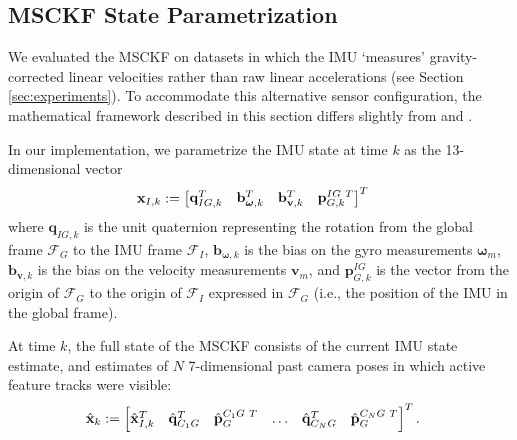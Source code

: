 \documentclass[letterpaper, 10 pt, conference]{ieeeconf}  %
\def\Vec#1{\mathbf{#1}}
\newcommand{\bbm}{\begin{bmatrix}}
\newcommand{\ebm}{\end{bmatrix}}
\begin{document}
\subsection{MSCKF State Parametrization}
We evaluated the MSCKF on datasets in which the IMU `measures' gravity-corrected linear velocities rather than raw linear accelerations (see Section \ref{sec:experiments}).
To accommodate this alternative sensor configuration, the mathematical framework described in this section differs slightly from \cite{Mourikis:2006:TechReport} and \cite{Mourikis:2007:ICRA}.

In our implementation, we parametrize the IMU state at time $k$ as the 13-dimensional vector
\begin{align}
    \Vec{x}_{I,k} &:= \bbm \Vec{q}_{IG,k}^T & \Vec{b}_{\boldsymbol{\omega},k}^T & \Vec{b}_{\Vec{v},k}^T & \Vec{p}_{G,k}^{IG \hspace{0.3em} T} \ebm^T
\end{align}
where $\Vec{q}_{IG,k}$ is the unit quaternion representing the rotation from the global frame $\mathcal{F}_G$ to the IMU frame $\mathcal{F}_I$, $\Vec{b}_{\boldsymbol{\omega},k}$ is the bias on the gyro measurements $\boldsymbol{\omega}_m$, $\Vec{b}_{\Vec{v},k}$ is the bias on the velocity measurements $\Vec{v}_m$, and $\Vec{p}_{G,k}^{IG}$ is the vector from the origin of $\mathcal{F}_G$ to the origin of $\mathcal{F}_I$ expressed in $\mathcal{F}_G$ (i.e., the position of the IMU in the global frame).

At time $k$, the full state of the MSCKF consists of the current IMU state estimate, and estimates of $N$ 7-dimensional past camera poses in which active feature tracks were visible:
\begin{align*}
    \hat{\Vec{x}}_k &:= \bbm \hat{\Vec{x}}_{I,k}^T & \hat{\Vec{q}}_{C_1 G}^T & \hat{\Vec{p}}_G^{C_1 G \hspace{0.3em} T} & \hdots & \hat{\Vec{q}}_{C_N G}^T & \hat{\Vec{p}}_G^{C_N G \hspace{0.3em} T} \ebm ^T.
\end{align*}
\end{document}
